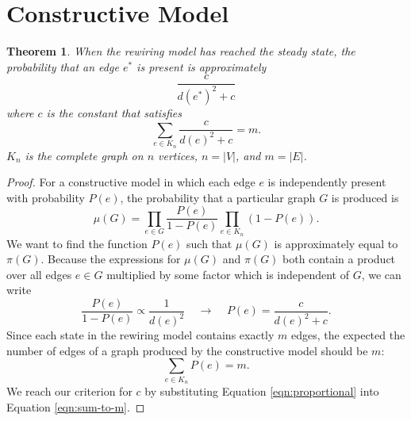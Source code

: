 \documentclass[a4paper,10pt]{article}
\newtheorem{theorem}{Theorem}
\begin{document}
\section{Constructive Model}
\begin{theorem}
\label{thm:perc}
When the rewiring model has reached the steady state, the probability that an edge $e^*$ is present is approximately
\begin{equation*}
 \frac{c}{d(e^*)^2 + c}
\end{equation*}
where $c$ is the constant that satisfies
\begin{equation}
\label{eqn:c}
 \sum_{e \in K_n} \frac{c}{d(e)^2 + c} = m.
\end{equation}
$K_n$ is the complete graph on $n$ vertices, $n = |V|$, and $m = |E|$.
\end{theorem}
\begin{proof}
For a constructive model in which each edge $e$ is independently present with probability $P(e)$, the probability that a particular graph $G$ is produced is
\begin{equation}
 \mu(G) = \prod\limits_{e \in G} \frac{P(e)}{1 - P(e)} \prod\limits_{e \in K_n} (1 - P(e)).
\end{equation}
We want to find the function $P(e)$ such that $\mu(G)$ is approximately equal to $\pi(G)$. Because the expressions for $\mu(G)$ and $\pi(G)$ both contain a product over all edges $e \in G$ multiplied by some factor which is independent of $G$, we can write
\begin{equation}
\label{eqn:proportional}
 \frac{P(e)}{1-P(e)} \propto \frac{1}{d(e)^2} \;\;\;\;\longrightarrow\;\;\;\; P(e) = \frac{c}{d(e)^2 + c}.
\end{equation}
Since each state in the rewiring model contains exactly $m$ edges, the expected the number of edges of a graph produced by the constructive model should be $m$:
\begin{equation}
\label{eqn:sum-to-m}
 \sum_{e \in K_n} P(e) = m.
\end{equation}
We reach our criterion for $c$ by substituting Equation \ref{eqn:proportional} into Equation \ref{eqn:sum-to-m}.
\end{proof}
\end{document}
